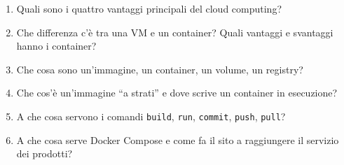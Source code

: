 \begin{domande}
\begin{enumerate}
  \item Quali sono i quattro vantaggi principali del cloud computing?
  \item Che differenza c'è tra una VM e un container? Quali vantaggi e svantaggi hanno i container?
  \item Che cosa sono un'immagine, un container, un volume, un registry?
  \item Che cos'è un'immagine ``a strati'' e dove scrive un container in esecuzione?
  \item A che cosa servono i comandi \texttt{build}, \texttt{run}, \texttt{commit}, \texttt{push}, \texttt{pull}?
  \item A che cosa serve Docker Compose e come fa il sito a raggiungere il servizio dei prodotti?
\end{enumerate}
\end{domande}
